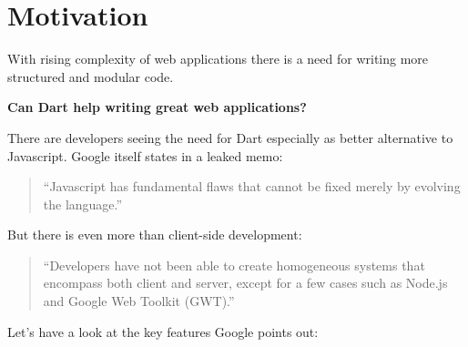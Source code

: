 \section{Motivation}

With rising complexity of web applications there is a need for writing more structured and modular code.

\textbf{Can Dart help writing great web applications?}



There are developers seeing the need for Dart especially as better alternative to Javascript. Google itself states in a leaked memo:

\begin{quotation}
``Javascript has fundamental flaws that cannot be fixed merely by evolving the language.''\cite{Memo}
\end{quotation}

But there is even more than client-side development:

\begin{quotation}
``Developers have not been able to create homogeneous systems that encompass both client and server, except for a few cases such as Node.js and Google Web Toolkit (GWT).''\cite{TechOver}
\end{quotation}


Let's have a look at the key features Google points out:\cite{TechOver}

